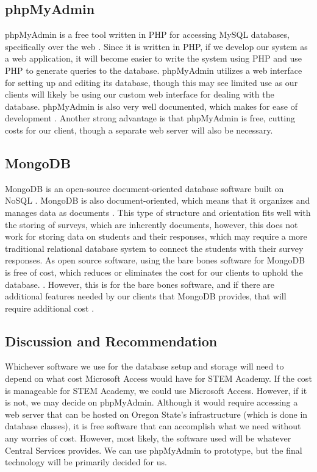 \documentclass[letterpaper,10pt,serif, draftclsnofoot,onecolumn, compsoc, titlepage]{IEEEtran}
\begin{document}
\subsection{phpMyAdmin}
phpMyAdmin is a free tool written in PHP for accessing MySQL databases, specifically over the web \cite{phpmyadmin}.
Since it is written in PHP, if we develop our system as a web application, it will become easier to write the system using PHP and use PHP to generate queries to the database.
phpMyAdmin utilizes a web interface for setting up and editing its database, though this may see limited use as our clients will likely be using our custom web interface for dealing with the database.
phpMyAdmin is also very well documented, which makes for ease of development \cite{phpmyadmin}.
Another strong advantage is that phpMyAdmin is free, cutting costs for our client, though a separate web server will also be necessary.
\subsection{MongoDB}
MongoDB is an open-source document-oriented database software built on NoSQL \cite{mongodb}.
MongoDB is also document-oriented, which means that it organizes and manages data as documents \cite{docdb}.
This type of structure and orientation fits well with the storing of surveys, which are inherently documents, however, this does not work for storing data on students and their responses, which may require a more traditional relational database system to connect the students with their survey responses.
As open source software, using the bare bones software for MongoDB is free of cost, which reduces or eliminates the cost for our clients to uphold the database. \cite{mongo_cost}.
However, this is for the bare bones software, and if there are additional features needed by our clients that MongoDB provides, that will require additional cost \cite{mongo_cost}.
\subsection{Discussion and Recommendation}
Whichever software we use for the database setup and storage will need to depend on what cost Microsoft Access would have for STEM Academy.
If the cost is manageable for STEM Academy, we could use Microsoft Access.
However, if it is not, we may decide on phpMyAdmin.
Although it would require accessing a web server that can be hosted on Oregon State's infrastructure (which is done in database classes), it is free software that can accomplish what we need without any worries of cost.
However, most likely, the software used will be whatever Central Services provides.
We can use phpMyAdmin to prototype, but the final technology will be primarily decided for us.
\end{document}
